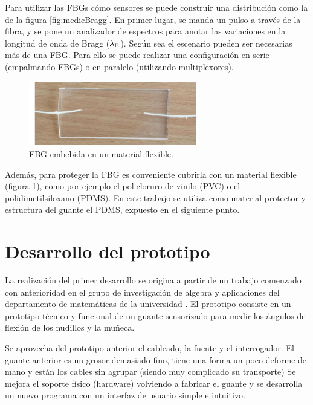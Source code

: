 \begin{itemize}
		Para utilizar las FBGs cómo sensores se puede construir una distribución como la de la figura \ref{fig:medicBragg}. En primer lugar, se manda un pulso a través de la fibra, y se pone un analizador de espectros para anotar las variaciones en la longitud de onda de Bragg ($\lambda\textsubscript{B}$). Según sea el escenario pueden ser necesarias más de una FBG. Para ello se puede realizar una configuración en serie (empalmando FBGs) o en paralelo (utilizando multiplexores). 
		
		\begin{figure}[H]
			\centering
			\includegraphics[width=0.65\textwidth]{./img/flexibleFBG}
			\caption{FBG embebida en un material flexible. \cite{nedomaPDMS}} 
			\label{fig:flexibleFBG}
		\end{figure}
	
		Además, para proteger la FBG es conveniente cubrirla con un material flexible (figura \ref{fig:flexibleFBG}), como por ejemplo el policloruro de vinilo (PVC) o el polidimetilsiloxano (PDMS). En este trabajo se utiliza como material protector y estructura del guante el PDMS, expuesto en el siguiente punto.
	
\end{itemize}


\section{Desarrollo del prototipo}
\label{sec:prototipo3}

La realización del primer desarrollo se origina a partir de un trabajo comenzado con anterioridad en el grupo de investigación de algebra y aplicaciones del departamento de matemáticas de la universidad \cite{SilviaTFM}. 
El prototipo consiste en un prototipo técnico y funcional de un guante sensorizado para medir los ángulos de flexión de los nudillos y la muñeca.

Se aprovecha del prototipo anterior el cableado, la fuente y el interrogador. El guante anterior es un grosor demasiado fino, tiene una forma un poco deforme de mano y están los cables sin agrupar (siendo muy complicado su transporte)
Se mejora el soporte físico (hardware) volviendo a fabricar el guante y se desarrolla un nuevo programa con un interfaz de usuario simple e intuitivo. 


